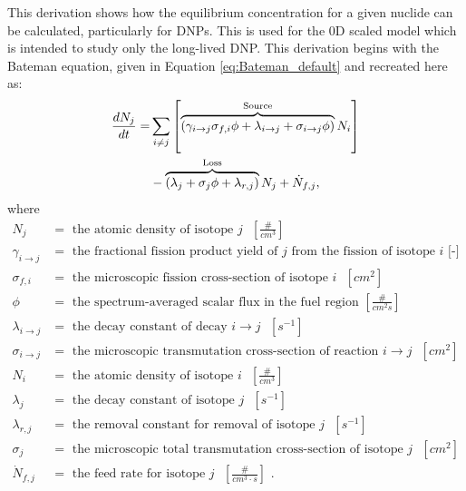 \renewcommand{\theequation}{B\thechapter.\arabic{equation}}
\label{sec:appendixB}
This derivation shows how the equilibrium concentration for a given nuclide can be calculated, particularly for \glspl{DNP}.
This is used for the 0D scaled model which is intended to study only the long-lived \gls{DNP}.
This derivation begins with the Bateman equation, given in Equation \eqref{eq:Bateman_default} and recreated here as:
\begin{equation} \hfill
\begin{split}
\frac{dN_j}{dt} =& \sum_{i \neq j}  \left [ \overbrace{\left( \gamma_{i \rightarrow j} \sigma_{f, i} \phi + \lambda _{i \rightarrow j} + \sigma_{i \rightarrow j} \phi \right)}^\text{Source} N_i \right ]\\
 & - \overbrace{\left ( \lambda_j + \sigma_j \phi + \lambda_{r, j} \right)}^\text{Loss} N_j + \dot{N}_{f, j},
\end{split}
\hfill \nonumber
\end{equation}
where
\begin{align}
N_j &= \mbox{ the atomic density of isotope $j$ $\left[\frac{\#}{cm^3}\right]$ } \nonumber \\ 
\gamma_{i \rightarrow j} &= \mbox{ the fractional fission product yield of $j$ from the fission of isotope $i$ [-]} \nonumber \\ 
\sigma_{f, i} &= \mbox{ the microscopic fission cross-section of isotope $i$ $\left[cm^2\right]$ } \nonumber \\ 
\phi &= \mbox{ the spectrum-averaged scalar flux in the fuel region $\left[\frac{\#}{cm^2 s}\right]$ } \nonumber \\ 
\lambda _{i \rightarrow j} &= \mbox{ the decay constant of decay $i \rightarrow j$ $\left[s^{-1}\right]$ } \nonumber \\ 
\sigma_{i \rightarrow j} &= \mbox{ the microscopic transmutation cross-section of reaction $i \rightarrow j$ $\left[cm^2\right]$ } \nonumber \\ 
N_i &= \mbox{ the atomic density of isotope $i$ $\left[\frac{\#}{cm^3}\right]$ } \nonumber \\ 
\lambda_j &= \mbox{ the decay constant of isotope $j$ $\left[s^{-1}\right]$ } \nonumber \\ 
\lambda_{r, j} &= \mbox{ the removal constant for removal of isotope $j$ $\left[s^{-1}\right]$ } \nonumber \\ 
\sigma_j &= \mbox{ the microscopic total transmutation cross-section of isotope $j$ $\left[cm^2\right]$ } \nonumber \\ 
\dot{N}_{f, j} &= \mbox{ the feed rate for isotope $j$ $\left[\frac{\#}{cm^3 \cdot s}\right]$ .} \nonumber
\end{align}


